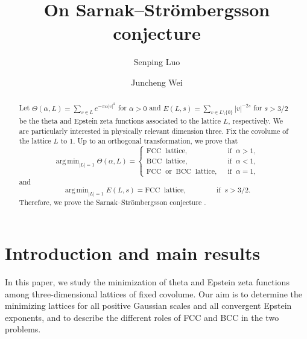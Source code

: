 \documentclass[reqno,english]{amsart}
\theoremstyle{definition}
\newtheorem{open problem}[theorem]{Open Problem}
\theoremstyle{remark}
\theoremstyle{plain}
\DeclareMathOperator*{\argmin}{arg\,min}
\numberwithin{equation}{section}
\newcommand{\Th}{\Theta}
\begin{document}
\title[Theta and Epstein energies in dimension three]{On Sarnak--Str\"{o}mbergsson conjecture}
\author[S. Luo]{Senping Luo}
\address[S.~Luo]{School of Mathematics and Statistics, Jiangxi Normal University, Nanchang, 330022, China; and Jiangxi Applied Mathematical Research Center.}
\author[J. Wei]{Juncheng Wei}
\address[J.~Wei]{Department of Mathematics, Chinese University of Hong
Kong, Shatin, NT, Hong Kong.}

\date{}
\begin{abstract}
Let $\Th(\alpha,L)=\sum_{v\in L}e^{-\pi\alpha|v|^2}$ for
       $\alpha>0$ and
 $E(L,s)=\sum_{v\in L\setminus\{0\}}|v|^{-2s}$ for
       $s>3/2$ be the theta and Epstein zeta functions associated to the lattice $L$, respectively. We are particularly interested in physically relevant dimension three.
Fix the covolume of the lattice $L$ to $1$. Up to an orthogonal transformation, we prove that
\begin{equation}\nonumber
\argmin_{|L|=1}\Th(\alpha,L)=
\begin{cases}
 \boldsymbol{\mathrm{FCC}}\;\;\mathrm{lattice},\;\;\;\;\;\;\;\;\; \;\;\;\;\;\;&\text{if}\;\; \alpha>1,\\
 \boldsymbol{\mathrm{BCC}}\;\;\mathrm{lattice}, \;\;\;\;\;\;\;\;\;\;\;\;\;\;\;&\text{if}\;\; \alpha<1,\\
 \boldsymbol{\mathrm{FCC}}\;\;\mathrm{or}\;\; \boldsymbol{\mathrm{BCC}}\;\;\mathrm{lattice},\;\;&\text{if}\;\;\alpha=1,
\end{cases}
\end{equation}
and
\begin{equation}\nonumber
\argmin_{|L|=1}E(L,s)=
 \boldsymbol{\mathrm{FCC}}\;\;\mathrm{lattice},\;\;\;\;\;\;\;\;\; \;\;\;\;\;\;\text{if}\;\; s>3/2.
\end{equation}
Therefore, we prove the
Sarnak--Str\"{o}mbergsson conjecture \cite[Inequalities (43)--(44), Section 5]{SS}.


\end{abstract}

\maketitle
\enlargethispage{12pt}
\setcounter{equation}{0}


\section{Introduction and main results}\label{sec:introduction}
In this paper, we study the minimization of theta and Epstein zeta
functions among three-dimensional lattices of fixed covolume. Our aim is
to determine the minimizing lattices for all positive Gaussian scales and
all convergent Epstein exponents, and to describe the different roles of
FCC and BCC in the two problems.
\end{document}
